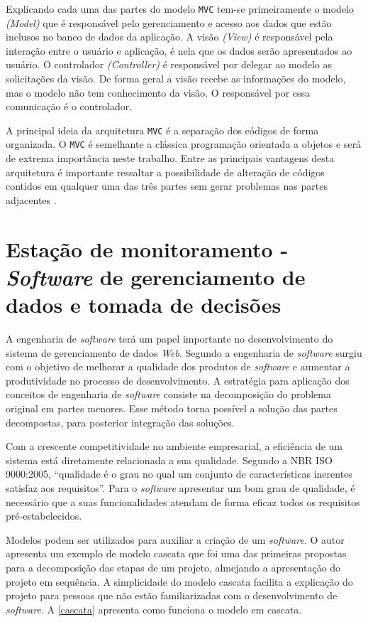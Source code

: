 Explicando cada uma das partes do modelo \texttt{MVC} tem-se primeiramente o modelo \textit{(Model)} que é responsável pelo gerenciamento e acesso aos dados
que estão inclusos no banco de dados da aplicação. A visão \textit{(View)} é responsável pela interação entre o usuário e aplicação, é nela que os 
dados serão apresentados ao usuário. O controlador \textit{(Controller)} é responsável por delegar ao modelo as solicitações da visão. De forma geral
a visão recebe as informações do modelo, mas o modelo não tem conhecimento da visão. O responsável por essa comunicação é o controlador.

A principal ideia da arquitetura \texttt{MVC} é a separação dos códigos de forma organizada. O \texttt{MVC} é semelhante a clássica programação orientada a 
objetos e será de extrema importância neste trabalho. Entre as principais vantagens desta arquitetura é importante ressaltar a possibilidade de alteração de códigos contidos em qualquer 
uma das três partes sem gerar problemas nas partes adjacentes \cite{devmediamvc}.

\section{Estação de monitoramento - \textit{Software} de gerenciamento de dados e tomada de decisões}

A engenharia de \textit{software} terá um papel importante no desenvolvimento do sistema de
gerenciamento de dados \textit{Web}. Segundo \cite{falbo2005} a engenharia de \textit{software} surgiu
com o objetivo de melhorar a qualidade dos produtos de \textit{software} e aumentar a produtividade
no processo de desenvolvimento. A estratégia para aplicação dos conceitos de engenharia de
\textit{software} consiste na decomposição do problema original em partes menores. Esse método torna
possível a solução das partes decompostas, para posterior integração das soluções.

Com a crescente competitividade no ambiente empresarial, a eficiência de um sistema
está diretamente relacionada a sua qualidade. Segundo a NBR ISO 9000:2005, “qualidade é o
grau no qual um conjunto de características inerentes satisfaz aos requisitos”. Para o \textit{software}
apresentar um bom grau de qualidade, é necessário que a suas funcionalidades atendam de
forma eficaz todos os requisitos pré-estabelecidos.

Modelos podem ser utilizados para auxiliar a criação de um \textit{software}. O autor \cite{cole2011}
apresenta um exemplo de modelo cascata que foi uma das primeiras propostas para a
decomposição das etapas de um projeto, almejando a apresentação do projeto em sequência. A
simplicidade do modelo cascata facilita a explicação do projeto para pessoas que não estão
familiarizadas com o desenvolvimento de \textit{software}. A \autoref{cascata} apresenta como funciona o modelo
em cascata.

